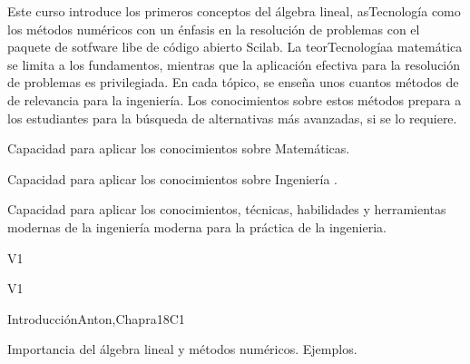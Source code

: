 \begin{syllabus}


\begin{justification}
Este curso introduce los primeros conceptos del álgebra lineal, asTecnología como los métodos numéricos con un énfasis en la resolución de problemas
con el paquete de sotfware libe de código abierto Scilab.
La teorTecnologíaa matemática se limita a los fundamentos, mientras que la aplicación efectiva para la resolución de problemas es privilegiada. 
En cada tópico, se enseña unos cuantos métodos de de relevancia para la ingeniería. 
Los conocimientos sobre estos métodos prepara a los estudiantes para la búsqueda de alternativas más avanzadas, si se lo requiere.
\end{justification}

\begin{goals}
\item Capacidad para aplicar los conocimientos sobre Matemáticas.
\item Capacidad para aplicar los conocimientos sobre Ingeniería .
\item Capacidad para aplicar los conocimientos, técnicas, habilidades y herramientas modernas de la ingeniería moderna para la práctica de la ingenieria.
\end{goals}

\begin{outcomes}{V1}
    \item {}
    \item {}
\end{outcomes}

\begin{competences}{V1}
    \item {} 
    \item {} 
    \item {} 
\end{competences}

\begin{unit}{Introducción}{}{Anton,Chapra}{18}{C1}
  \begin{topics}
      \item Importancia del álgebra lineal y métodos numéricos. Ejemplos.
   \end{topics}


\end{unit}
\end{syllabus}
